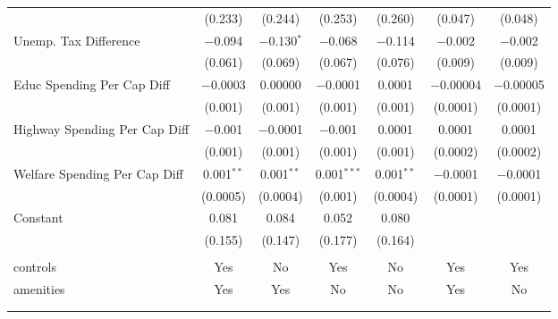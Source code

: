 \begin{table}[!htbp]
\begin{tabular}{@{\extracolsep{5pt}}lcccccc}
  & (0.233) & (0.244) & (0.253) & (0.260) & (0.047) & (0.048) \\ 
  Unemp. Tax Difference & $-$0.094 & $-$0.130$^{*}$ & $-$0.068 & $-$0.114 & $-$0.002 & $-$0.002 \\ 
  & (0.061) & (0.069) & (0.067) & (0.076) & (0.009) & (0.009) \\ 
  Educ Spending Per Cap Diff & $-$0.0003 & 0.00000 & $-$0.0001 & 0.0001 & $-$0.00004 & $-$0.00005 \\ 
  & (0.001) & (0.001) & (0.001) & (0.001) & (0.0001) & (0.0001) \\ 
  Highway Spending Per Cap Diff & $-$0.001 & $-$0.0001 & $-$0.001 & 0.0001 & 0.0001 & 0.0001 \\ 
  & (0.001) & (0.001) & (0.001) & (0.001) & (0.0002) & (0.0002) \\ 
  Welfare Spending Per Cap Diff & 0.001$^{**}$ & 0.001$^{**}$ & 0.001$^{***}$ & 0.001$^{**}$ & $-$0.0001 & $-$0.0001 \\ 
  & (0.0005) & (0.0004) & (0.001) & (0.0004) & (0.0001) & (0.0001) \\ 
  Constant & 0.081 & 0.084 & 0.052 & 0.080 &  &  \\ 
  & (0.155) & (0.147) & (0.177) & (0.164) &  &  \\ 
 \hline \\[-1.8ex] 
controls & Yes & No & Yes & No & Yes & Yes \\ 
amenities & Yes & Yes & No & No & Yes & No \\ 
\hline \\[-1.8ex] 
\hline 
\hline \\[-1.8ex] 
\end{tabular} 
\end{table} 
